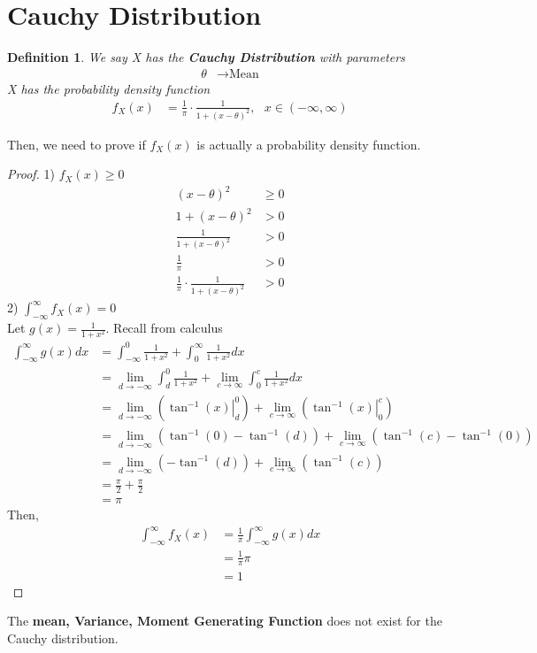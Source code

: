 \documentclass[11pt,oneside]{book}
\theoremstyle{break}
\theoremstyle{break}
\newtheorem{defn}{Definition}[corL]
\begin{document}
\section[Cauchy Distribution]{\color{DarkOrchid}Cauchy Distribution\color{black}}
\begin{defn}
We say X has the \textbf{Cauchy Distribution} with parameters \begin{align*}
\theta&\rightarrow \text{Mean}
\end{align*} X has the probability density function\begin{align*}
f_X(x)&=\frac{1}{\pi}\cdot \frac{1}{1+(x-\theta)^2},\text{ }x\in (-\infty,\infty)
\end{align*}
\end{defn}
Then, we need to prove if $f_X(x)$ is actually a probability density function. \begin{proof}
1) $f_X(x)\geq 0$\begin{align*}
(x-\theta)^2&\geq 0\\
1+(x-\theta)^2&>0\\
\frac{1}{1+(x-\theta)^2}&>0\\
\frac{1}{\pi}&>0\\
\frac{1}{\pi}\cdot \frac{1}{1+(x-\theta)^2}&>0
\end{align*}
2) $\int_{-\infty}^{\infty}f_X(x)=0$\\
Let $g(x)=\frac{1}{1+x^2}.$ Recall from calculus \begin{align*}
\int_{-\infty}^{\infty}g(x)dx&=\int_{-\infty}^{0}\frac{1}{1+x^2}+\int_{0}^{\infty}\frac{1}{1+x^2}dx\\
&=\lim_{d\rightarrow -\infty}\int_{d}^{0}\frac{1}{1+x^2}+\lim_{c\rightarrow \infty}\int_{0}^{c}\frac{1}{1+x^2}dx\\
&=\lim_{d\rightarrow -\infty}\left(\left. \tan^{-1}(x)\right|_{d}^{0} \right)+\lim_{c\rightarrow \infty}\left(\left. \tan^{-1}(x)\right|_{0}^{c} \right)\\
&=\lim_{d\rightarrow -\infty}\left(\tan^{-1}(0)-\tan^{-1}(d) \right)+\lim_{c\rightarrow \infty}\left(\tan^{-1}(c)-\tan^{-1}(0) \right)\\
&=\lim_{d\rightarrow -\infty}\left(-\tan^{-1}(d) \right)+\lim_{c\rightarrow \infty}\left(\tan^{-1}(c) \right)\\
&=\frac{\pi}{2}+\frac{\pi}{2}\\
&=\pi
\end{align*}
Then, \begin{align*}
\int_{-\infty}^{\infty}f_X(x)&=\frac{1}{\pi}\int_{-\infty}^{\infty}g(x)dx\\
&=\frac{1}{\pi}\pi\\
&=1
\end{align*}
\end{proof}
The \textbf{mean, Variance, Moment Generating Function} does not exist for the Cauchy distribution. 
\end{document}
